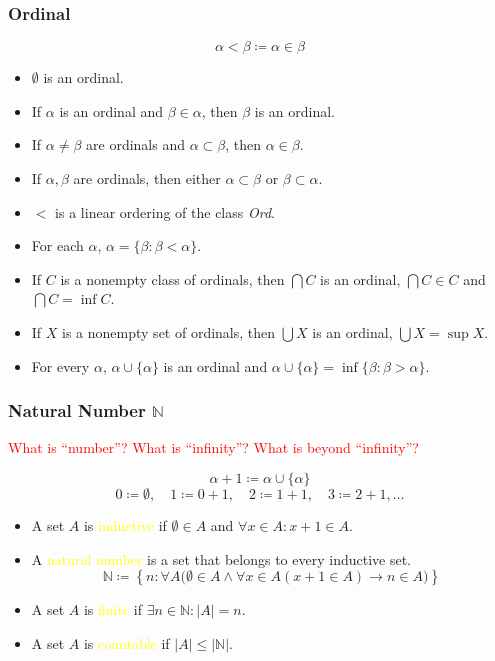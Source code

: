 \documentclass[UTF8,11pt,colorlinks,compress,openany]{beamer}%
\begin{document}
\begin{frame}\frametitle{Ordinal}
	\[\alpha<\beta\coloneqq \alpha\in\beta\]
	\begin{itemize}
		\item $\emptyset$ is an ordinal.
		\item If $\alpha$ is an ordinal and $\beta\in\alpha$, then $\beta$ is an ordinal.
		\item If $\alpha\neq\beta$ are ordinals and $\alpha\subset\beta$, then $\alpha\in\beta$.
		\item If $\alpha,\beta$ are ordinals, then either $\alpha\subset\beta$ or $\beta\subset\alpha$.
		\item $<$ is a linear ordering of the class \emph{Ord}.
		\item For each $\alpha$, $\alpha=\{\beta:\beta<\alpha\}$.
		\item If $C$ is a nonempty class of ordinals, then $\bigcap C$ is an ordinal, $\bigcap C\in C$ and $\bigcap C=\inf C$.
		\item If $X$ is a nonempty set of ordinals, then $\bigcup X$ is an ordinal, $\bigcup X=\sup X$.
		\item For every $\alpha$, $\alpha\cup\{\alpha\}$ is an ordinal and $\alpha\cup\{\alpha\}=\inf\{\beta:\beta>\alpha\}$.
	\end{itemize}
\end{frame}

\begin{frame}\frametitle{Natural Number $\mathbb{N}$}
	\begin{block}{}
		\centering\textcolor{red}{What is ``number''? What is ``infinity''? What is beyond ``infinity''?}
	\end{block}
	\[\alpha+1\coloneqq \alpha\cup\{\alpha\}\]
	\[0\coloneqq \emptyset,\quad 1\coloneqq 0+1,\quad 2\coloneqq 1+1,\quad 3\coloneqq 2+1, \dots\]
	\begin{itemize}
		\item A set $A$ is \textcolor{yellow}{inductive} if $\emptyset\in A$ and $\forall x\in A: x+1\in A$.
		\item A \textcolor{yellow}{natural number} is a set that belongs to every inductive set.
		\[\mathbb{N}\coloneqq \left\{n: \forall A\big(\emptyset\in A\wedge \forall x\in A(x+1\in A)\to n\in A\big)\right\}\]
		\item A set $A$ is \textcolor{yellow}{finite} if $\exists n\in\mathbb{N}: |A|=n$.
		\item A set $A$ is \textcolor{yellow}{countable} if $|A|\leq|\mathbb{N}|$.
	\end{itemize}
\end{frame}
\end{document}

